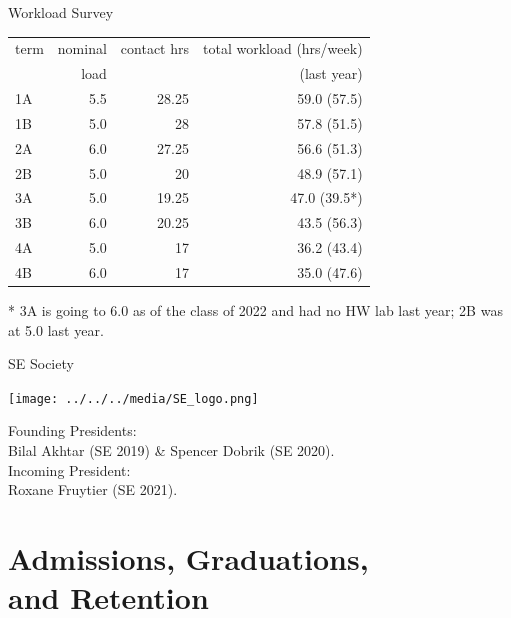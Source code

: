 \documentclass{beamer}
\begin{document}
\begin{frame}{Workload Survey}
  \begin{center}
  \begin{tabular}{lrrr}
    term&     nominal &contact hrs &    total workload (hrs/week) \\
& load & &     (last year)\\
1A  &     5.5    &28.25   & 59.0 (57.5)\\
1B  &     5.0    &28      & 57.8 (51.5)\\
2A  &     6.0    &27.25   & 56.6 (51.3)\\
2B  &     5.0    &20      & 48.9 (57.1)\\
3A  &     5.0    &19.25   & 47.0 (39.5*)\\
3B  &     6.0    &20.25   & 43.5 (56.3)\\
4A  &     5.0    &17      & 36.2 (43.4)\\
4B  &     6.0    &17      & 35.0 (47.6)
  \end{tabular}

  * 3A is going to 6.0 as of the class of 2022 and had no HW lab last year; 2B was at 5.0 last year.
  \end{center}
\end{frame}

\begin{frame}{SE Society}
  \begin{center}
    \texttt{[image: ../../../media/SE\_logo.png]}
  \end{center}
  \vspace*{-5em}
  \begin{center}
    Founding Presidents: \\
    Bilal Akhtar (SE 2019) \& Spencer Dobrik (SE 2020).\\
    Incoming President: \\
    Roxane Fruytier (SE 2021).
  \end{center}
\end{frame}

\part{Admissions, Graduations, \\ and Retention}
\frame{\partpage}
\end{document}
